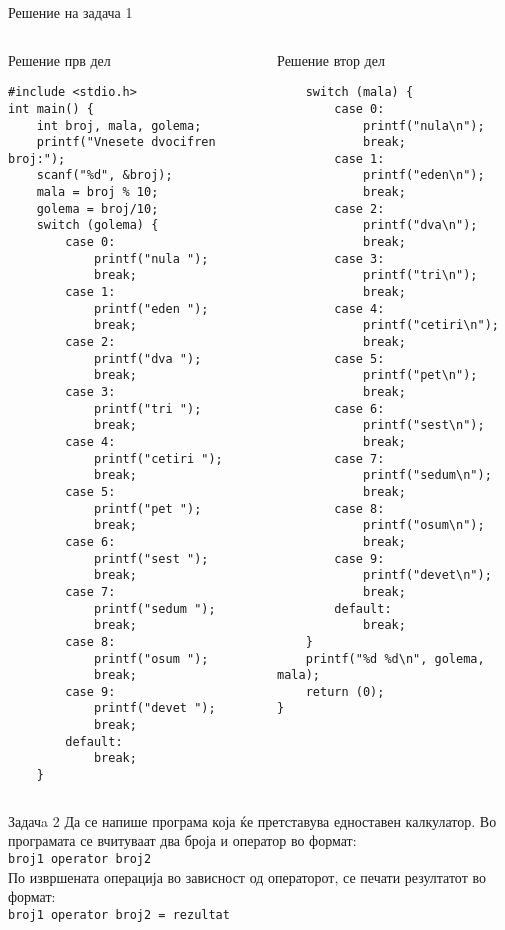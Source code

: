 \begin{frame}[t,fragile,shrink=35]{Решение на задача 1}
\begin{columns}
\begin{exampleblock}{Решение прв дел}
\begin{lstlisting}
#include <stdio.h>
int main() {
    int broj, mala, golema;
    printf("Vnesete dvocifren broj:");
    scanf("%d", &broj);
    mala = broj % 10;
    golema = broj/10;
    switch (golema) {
        case 0:
            printf("nula ");
            break;
        case 1:
            printf("eden ");
            break;
        case 2:
            printf("dva ");
            break;
        case 3:
            printf("tri ");
            break;
        case 4:
            printf("cetiri ");
            break;
        case 5:
            printf("pet ");
            break;
        case 6:
            printf("sest ");
            break;
        case 7:
            printf("sedum ");
            break;
        case 8:
            printf("osum ");
            break;
        case 9:
            printf("devet ");
            break;
        default:
            break;
    }
\end{lstlisting}
\end{exampleblock}
\begin{exampleblock}{Решение втор дел}
\begin{lstlisting}
    switch (mala) {
        case 0:
            printf("nula\n");
            break;
        case 1:
            printf("eden\n");
            break;
        case 2:
            printf("dva\n");
            break;
        case 3:
            printf("tri\n");
            break;
        case 4:
            printf("cetiri\n");
            break;
        case 5:
            printf("pet\n");
            break;
        case 6:
            printf("sest\n");
            break;
        case 7:
            printf("sedum\n");
            break;
        case 8:
            printf("osum\n");
            break;
        case 9:
            printf("devet\n");
            break;
        default:
            break;
    }
    printf("%d %d\n", golema, mala);
    return (0);
}
\end{lstlisting}
\end{exampleblock}
\end{columns}
\end{frame}


\begin{frame}{Задачa 2}
Да се напише програма која ќе претставува едноставен калкулатор. Во програмата
се вчитуваат два броја и оператор во формат:\\
\texttt{broj1 operator broj2}\\
По извршената операција во зависност од операторот, се печати резултатот во
формат:\\
\texttt{broj1 operator broj2 = rezultat}
\end{frame}

